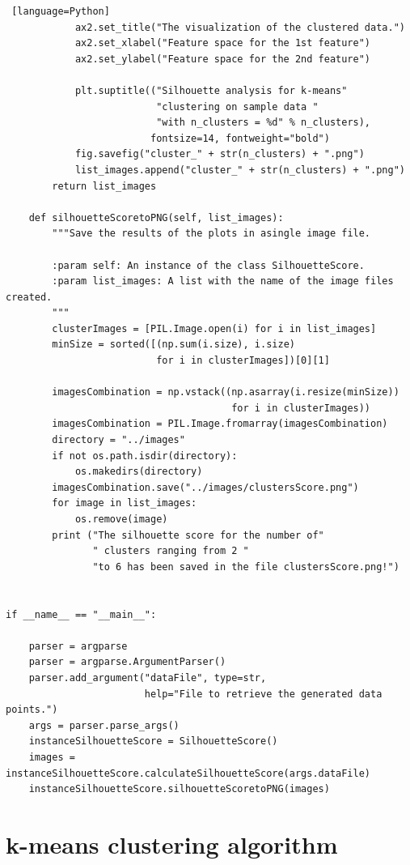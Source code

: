 \documentclass[11pt]{article}
\begin{document}
\begin{lstlisting} [language=Python]
            ax2.set_title("The visualization of the clustered data.")
            ax2.set_xlabel("Feature space for the 1st feature")
            ax2.set_ylabel("Feature space for the 2nd feature")

            plt.suptitle(("Silhouette analysis for k-means"
                          "clustering on sample data "
                          "with n_clusters = %d" % n_clusters),
                         fontsize=14, fontweight="bold")
            fig.savefig("cluster_" + str(n_clusters) + ".png")
            list_images.append("cluster_" + str(n_clusters) + ".png")
        return list_images

    def silhouetteScoretoPNG(self, list_images):
        """Save the results of the plots in asingle image file.

        :param self: An instance of the class SilhouetteScore.
        :param list_images: A list with the name of the image files created.
        """
        clusterImages = [PIL.Image.open(i) for i in list_images]
        minSize = sorted([(np.sum(i.size), i.size)
                          for i in clusterImages])[0][1]

        imagesCombination = np.vstack((np.asarray(i.resize(minSize))
                                       for i in clusterImages))
        imagesCombination = PIL.Image.fromarray(imagesCombination)
        directory = "../images"
        if not os.path.isdir(directory):
            os.makedirs(directory)
        imagesCombination.save("../images/clustersScore.png")
        for image in list_images:
            os.remove(image)
        print ("The silhouette score for the number of"
               " clusters ranging from 2 "
               "to 6 has been saved in the file clustersScore.png!")


if __name__ == "__main__":

    parser = argparse
    parser = argparse.ArgumentParser()
    parser.add_argument("dataFile", type=str,
                        help="File to retrieve the generated data points.")
    args = parser.parse_args()
    instanceSilhouetteScore = SilhouetteScore()
    images = instanceSilhouetteScore.calculateSilhouetteScore(args.dataFile)
    instanceSilhouetteScore.silhouetteScoretoPNG(images)

\end{lstlisting}

    

\section{k-means clustering
 algorithm}\label{k-means-clustering-algorithm}
\end{document}
